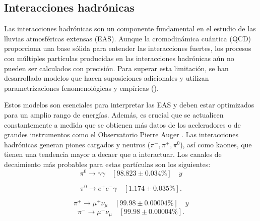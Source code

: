 \subsection{Interacciones hadrónicas}
Las interacciones hadrónicas son un componente fundamental en el estudio de las lluvias atmosféricas extensas (EAS). Aunque la cromodinámica cuántica (QCD) proporciona una base sólida para entender las interacciones fuertes, los procesos con múltiples partículas producidas en las interacciones hadrónicas aún no pueden ser calculados con precisión. Para superar esta limitación, se han desarrollado modelos que hacen suposiciones adicionales y utilizan parametrizaciones fenomenológicas y empíricas (\cite{Allen}).

Estos modelos son esenciales para interpretar las EAS y deben estar optimizados para un amplio rango de energías. Además, es crucial que se actualicen constantemente a medida que se obtienen más datos de los aceleradores o de grandes instrumentos como el Observatorio Pierre Auger \cite{andrada_2021}. Las interacciones hadrónicas generan piones cargados y neutros ($\pi^{-},\pi^{+},\pi^{0}$), así como kaones, que tienen una tendencia mayor a decaer que a interactuar. Los canales de decaimiento más probables para estas partículas son los siguientes:
\begin{equation*}
\pi^{0} \rightarrow \gamma\gamma \quad [{98.823 \pm 0.034}{\%}] \quad y
\end{equation*}

\begin{equation}
\pi^{0} \rightarrow e^{+}e^{-} \gamma \quad [{1.174 \pm 0.035}{\%}] .
\end{equation}

\begin{equation*}
\pi^{+} \rightarrow \mu^{+}\nu_{\mu} \quad [{99.98 \pm 0.00004}{\%}] \quad y
\end{equation*}
%
\begin{equation}
\pi^{-} \rightarrow \mu^{-}\nu_{\mu} \quad [{99.98 \pm 0.00004}{\%}] .
\end{equation}

